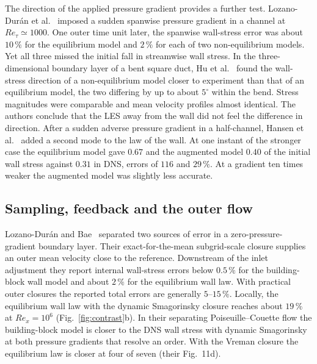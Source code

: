 \documentclass[pdflatex,sn-nature,iicol]{sn-jnl}
\begin{document}
The direction of the applied pressure gradient provides a further test. Lozano-Dur\'an et al.~\cite{LozanoDuran2019} imposed a sudden spanwise pressure gradient in a channel at $Re_\tau\simeq1000$. One outer time unit later, the spanwise wall-stress error was about $10\,\%$ for the equilibrium model and $2\,\%$ for each of two non-equilibrium models. Yet all three missed the initial fall in streamwise wall stress. In the three-dimensional boundary layer of a bent square duct, Hu et al.~\cite{Hu2023} found the wall-stress direction of a non-equilibrium model closer to experiment than that of an equilibrium model, the two differing by up to about $5^\circ$ within the bend. Stress magnitudes were comparable and mean velocity profiles almost identical. The authors conclude that the LES away from the wall did not feel the difference in direction. After a sudden adverse pressure gradient in a half-channel, Hansen et al.~\cite{Hansen2023} added a second mode to the law of the wall. At one instant of the stronger case the equilibrium model gave $0.67$ and the augmented model $0.40$ of the initial wall stress against $0.31$ in DNS, errors of $116$ and $29\,\%$. At a gradient ten times weaker the augmented model was slightly less accurate.



\subsection{Sampling, feedback and the outer flow}
Lozano-Dur\'an and Bae~\cite{LozanoDuranBae2023} separated two sources of error in a zero-pressure-gradient boundary layer. Their exact-for-the-mean subgrid-scale closure supplies an outer mean velocity close to the reference. Downstream of the inlet adjustment they report internal wall-stress errors below $0.5\,\%$ for the building-block wall model and about $2\,\%$ for the equilibrium wall law. With practical outer closures the reported total errors are generally $5$--$15\,\%$. Locally, the equilibrium wall law with the dynamic Smagorinsky closure reaches about $19\,\%$ at $Re_x=10^6$ (Fig.~\ref{fig:contrast}b). In their separating Poiseuille--Couette flow the building-block model is closer to the DNS wall stress with dynamic Smagorinsky at both pressure gradients that resolve an order. With the Vreman closure the equilibrium law is closer at four of seven (their Fig.~11d).
\end{document}
